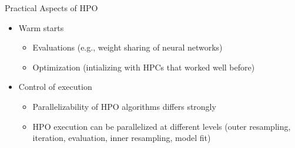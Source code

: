 \documentclass[11pt,compress,t,notes=noshow, xcolor=table]{beamer}
\begin{document}
\begin{vbframe}{Practical Aspects of HPO}
\begin{itemize}
    \item Warm starts
    \begin{itemize}
        \item Evaluations (e.g., weight sharing of neural networks)
        \item Optimization (intializing with HPCs that worked well before)
    \end{itemize}
    \item Control of execution
    \begin{itemize}
        \item Parallelizability of HPO algorithms differs strongly 
        \item  HPO execution can be parallelized at different levels (outer resampling, iteration, evaluation, inner resampling, model fit)
    \end{itemize}
\end{itemize}
\end{vbframe}


\endlecture
\end{document}
